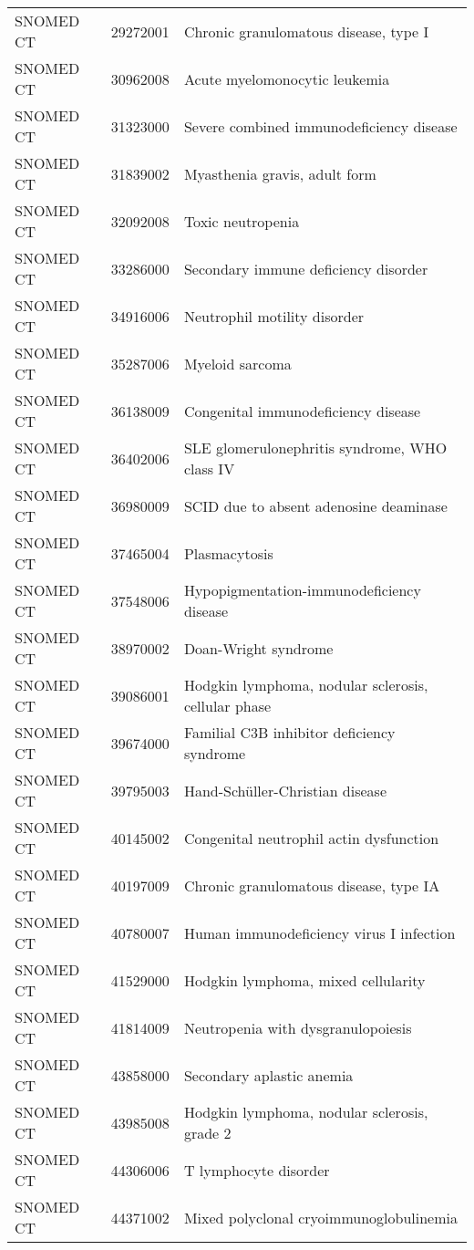 \begin{longtable}{p{}p{}p{}}
  SNOMED CT & 29272001 & Chronic granulomatous disease, type I \\ 
  SNOMED CT & 30962008 & Acute myelomonocytic leukemia \\ 
  SNOMED CT & 31323000 & Severe combined immunodeficiency disease \\ 
  SNOMED CT & 31839002 & Myasthenia gravis, adult form \\ 
  SNOMED CT & 32092008 & Toxic neutropenia \\ 
  SNOMED CT & 33286000 & Secondary immune deficiency disorder \\ 
  SNOMED CT & 34916006 & Neutrophil motility disorder \\ 
  SNOMED CT & 35287006 & Myeloid sarcoma \\ 
  SNOMED CT & 36138009 & Congenital immunodeficiency disease \\ 
  SNOMED CT & 36402006 & SLE glomerulonephritis syndrome, WHO class IV \\ 
  SNOMED CT & 36980009 & SCID due to absent adenosine deaminase \\ 
  SNOMED CT & 37465004 & Plasmacytosis \\ 
  SNOMED CT & 37548006 & Hypopigmentation-immunodeficiency disease \\ 
  SNOMED CT & 38970002 & Doan-Wright syndrome \\ 
  SNOMED CT & 39086001 & Hodgkin lymphoma, nodular sclerosis, cellular phase \\ 
  SNOMED CT & 39674000 & Familial C3B inhibitor deficiency syndrome \\ 
  SNOMED CT & 39795003 & Hand-Schüller-Christian disease \\ 
  SNOMED CT & 40145002 & Congenital neutrophil actin dysfunction \\ 
  SNOMED CT & 40197009 & Chronic granulomatous disease, type IA \\ 
  SNOMED CT & 40780007 & Human immunodeficiency virus I infection \\ 
  SNOMED CT & 41529000 & Hodgkin lymphoma, mixed cellularity \\ 
  SNOMED CT & 41814009 & Neutropenia with dysgranulopoiesis \\ 
  SNOMED CT & 43858000 & Secondary aplastic anemia \\ 
  SNOMED CT & 43985008 & Hodgkin lymphoma, nodular sclerosis, grade 2 \\ 
  SNOMED CT & 44306006 & T lymphocyte disorder \\ 
  SNOMED CT & 44371002 & Mixed polyclonal cryoimmunoglobulinemia \\ 

\end{longtable}
